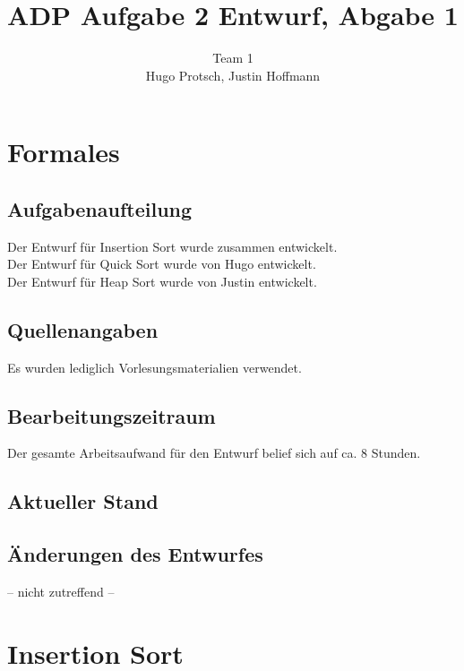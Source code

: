 \documentclass[11pt]{article}
\title{ADP Aufgabe 2 Entwurf, Abgabe 1}
\author{Team 1\\Hugo Protsch, Justin Hoffmann}
\begin{document}
    \maketitle

    \tableofcontents

    \newpage


    \section{Formales}\label{sec:Formales}


    \subsection*{Aufgabenaufteilung}
    Der Entwurf für Insertion Sort wurde zusammen entwickelt.\\
    Der Entwurf für Quick Sort wurde von Hugo entwickelt.\\
    Der Entwurf für Heap Sort wurde von Justin entwickelt.

    \subsection*{Quellenangaben}
    Es wurden lediglich Vorlesungsmaterialien verwendet.

    \subsection*{Bearbeitungszeitraum}
    Der gesamte Arbeitsaufwand für den Entwurf belief sich auf ca. 8 Stunden.


    \subsection*{Aktueller Stand}

    \subsection*{Änderungen des Entwurfes}
    -- nicht zutreffend --


    \section{Insertion Sort}\label{sec:insertion-sort}
\end{document}
